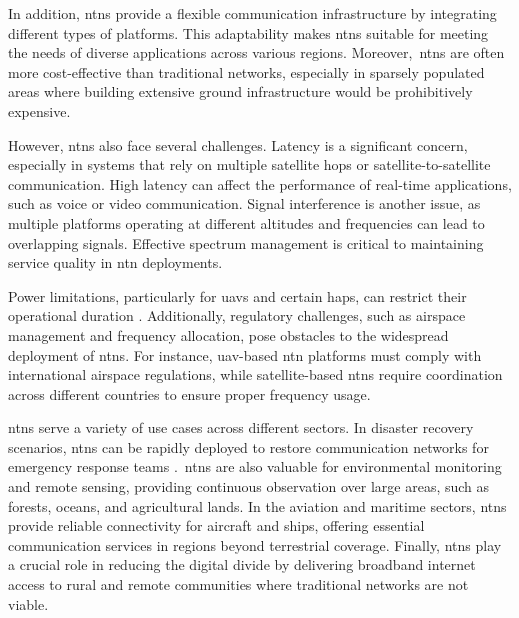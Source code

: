 In addition, \glspl{ntn} provide a flexible communication infrastructure by integrating different types of platforms. This adaptability makes \glspl{ntn} suitable for meeting the needs of diverse applications across various regions. Moreover,\ \glspl{ntn} are often more cost-effective than traditional networks, especially in sparsely populated areas where building extensive ground infrastructure would be prohibitively expensive.

However, \glspl{ntn} also face several challenges. Latency is a significant concern, especially in systems that rely on multiple satellite hops or satellite-to-satellite communication. High latency can affect the performance of real-time applications, such as voice or video communication. Signal interference is another issue, as multiple platforms operating at different altitudes and frequencies can lead to overlapping signals. Effective spectrum management is critical to maintaining service quality in \gls{ntn} deployments.

Power limitations, particularly for \glspl{uav} and certain \glspl{hap}, can restrict their operational duration \autocite{power_efficiency_uav}. Additionally, regulatory challenges, such as airspace management and frequency allocation, pose obstacles to the widespread deployment of \glspl{ntn}. For instance, \gls{uav}-based \gls{ntn} platforms must comply with international airspace regulations, while satellite-based \glspl{ntn} require coordination across different countries to ensure proper frequency usage.

\glspl{ntn} serve a variety of use cases across different sectors. In disaster recovery scenarios, \glspl{ntn} can be rapidly deployed to restore communication networks for emergency response teams \autocite{ntn_challenges_and_opportunities}.\ \glspl{ntn} are also valuable for environmental monitoring and remote sensing, providing continuous observation over large areas, such as forests, oceans, and agricultural lands. In the aviation and maritime sectors, \glspl{ntn} provide reliable connectivity for aircraft and ships, offering essential communication services in regions beyond terrestrial coverage. Finally, \glspl{ntn} play a crucial role in reducing the digital divide by delivering broadband internet access to rural and remote communities where traditional networks are not viable.

